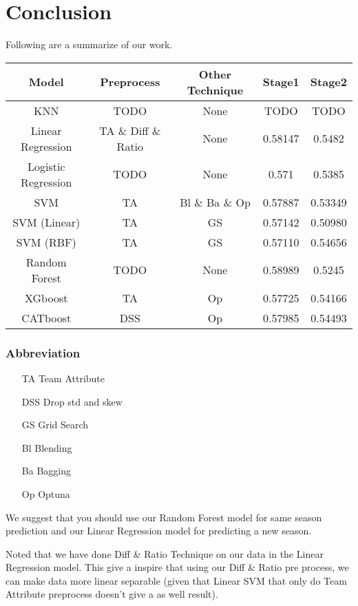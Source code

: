 \section{Conclusion}
Following are a summarize of our work.
\begin{table}[h]
    \centering
    \begin{tabular}{|c|c|c|c|c|}
    \hline
    Model & Preprocess & Other Technique & Stage1 & Stage2 \\ \hline\hline
    KNN   & TODO   & None & TODO & TODO  \\ \hline
    Linear Regression & TA \& Diff \& Ratio & None & 0.58147 & 0.5482 \\ \hline
    Logistic Regression & TODO & None & 0.571 & 0.5385 \\ \hline
    SVM & TA & Bl \& Ba \& Op & 0.57887 & 0.53349 \\ \hline
    SVM (Linear) & TA & GS & 0.57142 & 0.50980 \\ \hline
    SVM (RBF) & TA & GS & 0.57110 & 0.54656 \\ \hline
    Random Forest & TODO & None & 0.58989 & 0.5245 \\ \hline
    XGboost & TA & Op & 0.57725 & 0.54166 \\ \hline
    CATboost & DSS & Op & 0.57985 & 0.54493 \\ \hline
    \end{tabular}
    \label{tab:example_table}
\end{table}
\subsubsection*{Abbreviation}
\begin{itemize}
    \item[TA] Team Attribute
    \item[DSS] Drop std and skew 
    \item[GS] Grid Search
    \item[Bl] Blending
    \item[Ba] Bagging
    \item[Op] Optuna  
\end{itemize}

\par We suggest that you should use our Random Forest model for same season prediction and our Linear Regression model for predicting a new season. 
\par Noted that we have done Diff \& Ratio Technique on our data in the Linear Regression model. This give a inspire that using our Diff \& Ratio pre process, we can make data more linear separable (given that Linear SVM that only do Team Attribute preprocess doesn't give a as well result).
